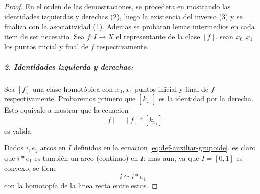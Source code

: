 \begin{proof}
En el orden de las demostraciones, se procedera en mostrando las
identidades izquierdas y derechas (2), luego la existencia del inverso
(3) y se finaliza con la asociatividad (1). Ademas se probaran lemas
intermedios en cada item de ser necesario. Sea \(f : I
\to X\) el representante de la clase \([f]\). sean \(x_0, x_1\) los
puntos inicial y final de \(f\) respectivamente.

\subparagraph{2. Identidades izquierda y derechas:} Sea \([f]\) una clase
homotópica con \(x_0, x_1\) puntos inicial y final de \(f\)
respectivamente. Probaremos primero que \([k_{x_1}]\) es la identidad
por la derecha. Esto equivale a mostrar que la ecuacion
\[ [f] = [f] * [k_{x_1}]\]
es valida.

Dados \(i,e_1\) arcos en \(I\) definidos en la
ecuacion \eqref{eq:def-auxiliar-grupoide},
es claro que \(i * e_1\) es también un arco (continuo) en \(I\); mas aun,
ya que \(I = [0,1]\) es convexo, se tiene
\begin{equation}
i \simeq i * e_1 \label{eq:ident-homotopy}
\end{equation}
con la homotopía de la linea recta entre estos.


\end{proof}
